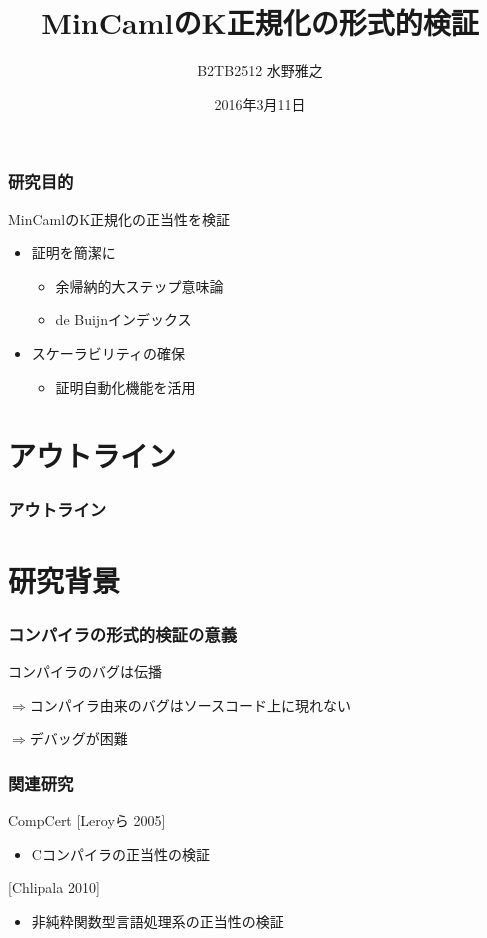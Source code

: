 \documentclass[dvipdfmx,cjk,xcolor=dvipsnames,envcountsect,notheorems,12pt]{beamer}
\title{MinCamlのK正規化の形式的検証}
\author{B2TB2512 水野雅之}
\institute[東北大学　住井・松田研]{工学部　情報知能システム総合学科\\住井・松田研究室}%
\date{2016年3月11日}
\theoremstyle{definition}
\begin{document}
\frame[plain]{\titlepage}%

\begin{frame}
	\frametitle{研究目的}
	\LARGE MinCamlのK正規化の正当性を検証
	\begin{itemize}
		\item 証明を簡潔に
			\begin{itemize}
				\item 余帰納的大ステップ意味論
				\item de Buijnインデックス
			\end{itemize}
		\item スケーラビリティの確保
			\begin{itemize}
				\item 証明自動化機能を活用
			\end{itemize}
	\end{itemize}
\end{frame}

\section*{アウトライン}

\begin{frame}
  \frametitle{アウトライン}
  \tableofcontents[sectionstyle=show,subsectionstyle=hide]
\end{frame}

\section{研究背景}

\begin{frame}
	\frametitle{コンパイラの形式的検証の意義}
	\Large コンパイラのバグは伝播

	\vfill

	$\Rightarrow$コンパイラ由来のバグはソースコード上に現れない

	\vfill

	$\Rightarrow$デバッグが困難
\end{frame}

\begin{frame}
	\frametitle{関連研究}
	\LARGE CompCert [Leroyら 2005]
	\begin{itemize}
		\item Cコンパイラの正当性の検証
	\end{itemize}

	[Chlipala 2010]
	\begin{itemize}
		\item 非純粋関数型言語処理系の正当性の検証
	\end{itemize}
\end{frame}
\end{document}
